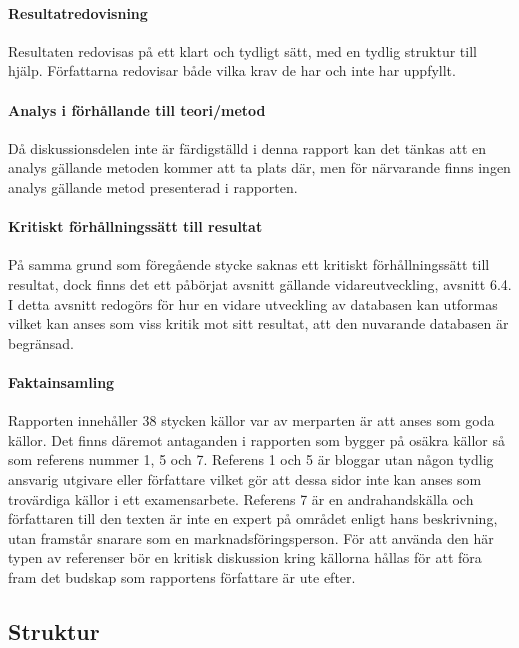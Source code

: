     \paragraph{Resultatredovisning}
        Resultaten redovisas på ett klart och tydligt sätt, med en tydlig struktur till hjälp. Författarna redovisar både vilka krav de har och inte har uppfyllt.

    \paragraph{Analys i förhållande till teori/metod  }
        Då diskussionsdelen inte är färdigställd i denna rapport kan det tänkas att en analys gällande metoden kommer att ta plats där, men för närvarande finns ingen analys gällande metod presenterad i rapporten.

    \paragraph{Kritiskt förhållningssätt till resultat}
        På samma grund som föregående stycke saknas ett kritiskt förhållningssätt till resultat, dock finns det ett påbörjat avsnitt gällande vidareutveckling, avsnitt 6.4. I detta avsnitt redogörs för hur en vidare utveckling av databasen kan utformas vilket kan anses som viss kritik mot sitt resultat, att den nuvarande databasen är begränsad.

    \paragraph{Faktainsamling}
        Rapporten innehåller 38 stycken källor var av merparten är att anses som goda källor. Det finns däremot antaganden i rapporten som bygger på osäkra källor så som referens nummer 1, 5 och 7. Referens 1 och 5 är bloggar utan någon tydlig ansvarig utgivare eller författare vilket gör att dessa sidor inte kan anses som trovärdiga källor i ett examensarbete. Referens 7 är en andrahandskälla och författaren till den texten är inte en expert på området enligt hans beskrivning, utan framstår snarare som en marknadsföringsperson. För att använda den här typen av referenser bör en kritisk diskussion kring källorna hållas för att föra fram det budskap som rapportens författare är ute efter.


    \subsection{Struktur} %
    \label{sub:struktur}

